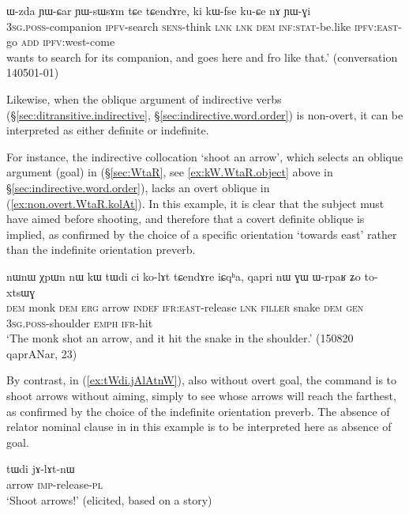 \begin{exe}
\ex \label{ex:kuCe.nA.YWGi2}
\gll ɯ-zda ɲɯ-ɕar ɲɯ-sɯsɤm  tɕe tɕendɤre, ki kɯ-fse ku-ɕe nɤ ɲɯ-ɣi \\
\textsc{3sg}.\textsc{poss}-companion \textsc{ipfv}-search \textsc{sens}-think \textsc{lnk} \textsc{lnk} \textsc{dem} \textsc{inf}:\textsc{stat}-be.like \textsc{ipfv}:\textsc{east}-go \textsc{add} \textsc{ipfv}:west-come \\
 wants to search for its companion, and goes here and fro like that.' (conversation 140501-01)
\end{exe}

Likewise, when the oblique argument of indirective verbs (§\ref{sec:ditransitive.indirective}, §\ref{sec:indirective.word.order}) is non-overt, it can be interpreted as either definite or indefinite.

For instance, the indirective collocation  `shoot an arrow', which selects an oblique argument (goal) in  (§\ref{sec:WtaR}, see \ref{ex:kW.WtaR.object} above in §\ref{sec:indirective.word.order}), lacks an overt oblique in (\ref{ex:non.overt.WtaR.kolAt}). In this example, it is clear that the subject must have aimed before shooting, and therefore that a covert definite oblique is implied, as confirmed by the choice of a specific orientation `towards east' rather than the indefinite orientation preverb.

\begin{exe}
\ex \label{ex:non.overt.WtaR.kolAt}
\gll  nɯnɯ χpɯn nɯ kɯ tɯdi ci ko-lɤt tɕendɤre iɕqʰa,  qapri nɯ ɣɯ ɯ-rpaʁ ʑo to-xtsɯɣ \\
\textsc{dem} monk \textsc{dem} \textsc{erg} arrow \textsc{indef} \textsc{ifr}:\textsc{east}-release \textsc{lnk} \textsc{filler} snake \textsc{dem} \textsc{gen} \textsc{3sg}.\textsc{poss}-shoulder \textsc{emph} \textsc{ifr}-hit \\
\glt `The monk shot an arrow, and it hit the snake in the shoulder.' (150820 qaprANar, 23)
\end{exe}

By contrast, in (\ref{ex:tWdi.jAlAtnW}), also without overt goal, the command is to shoot arrows without aiming, simply to see whose arrows will reach the farthest, as confirmed by the choice of the indefinite orientation preverb. The absence of relator nominal clause in  in this example is to be interpreted here as absence of goal.

\begin{exe}
\ex \label{ex:tWdi.jAlAtnW}
\gll  tɯdi jɤ-lɤt-nɯ \\
arrow \textsc{imp}-release-\textsc{pl} \\
\glt `Shoot arrows!' (elicited, based on a story)
\end{exe}

